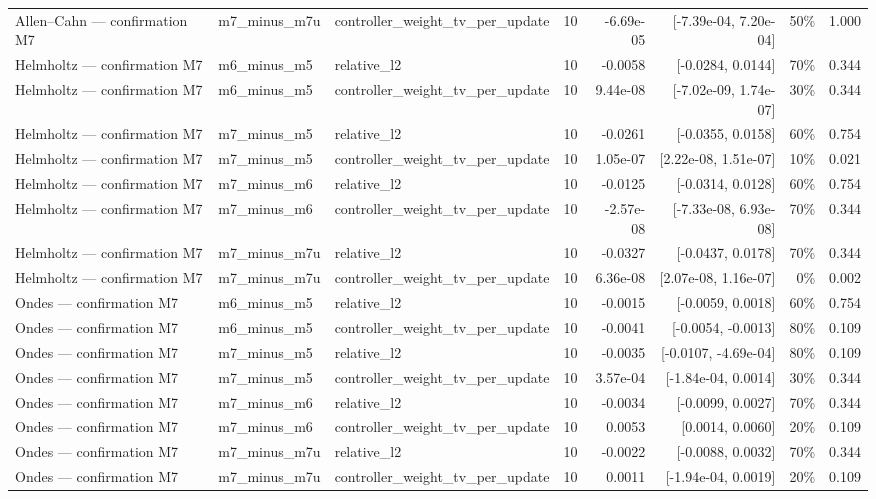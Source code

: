 \begin{tabular}{llllrrrr}
Allen–Cahn — confirmation M7 & m7\_minus\_m7u & controller\_weight\_tv\_per\_update & 10 & -6.69e-05 & [-7.39e-04, 7.20e-04] & 50\% & 1.000 \\
Helmholtz — confirmation M7 & m6\_minus\_m5 & relative\_l2 & 10 & -0.0058 & [-0.0284, 0.0144] & 70\% & 0.344 \\
Helmholtz — confirmation M7 & m6\_minus\_m5 & controller\_weight\_tv\_per\_update & 10 & 9.44e-08 & [-7.02e-09, 1.74e-07] & 30\% & 0.344 \\
Helmholtz — confirmation M7 & m7\_minus\_m5 & relative\_l2 & 10 & -0.0261 & [-0.0355, 0.0158] & 60\% & 0.754 \\
Helmholtz — confirmation M7 & m7\_minus\_m5 & controller\_weight\_tv\_per\_update & 10 & 1.05e-07 & [2.22e-08, 1.51e-07] & 10\% & 0.021 \\
Helmholtz — confirmation M7 & m7\_minus\_m6 & relative\_l2 & 10 & -0.0125 & [-0.0314, 0.0128] & 60\% & 0.754 \\
Helmholtz — confirmation M7 & m7\_minus\_m6 & controller\_weight\_tv\_per\_update & 10 & -2.57e-08 & [-7.33e-08, 6.93e-08] & 70\% & 0.344 \\
Helmholtz — confirmation M7 & m7\_minus\_m7u & relative\_l2 & 10 & -0.0327 & [-0.0437, 0.0178] & 70\% & 0.344 \\
Helmholtz — confirmation M7 & m7\_minus\_m7u & controller\_weight\_tv\_per\_update & 10 & 6.36e-08 & [2.07e-08, 1.16e-07] & 0\% & 0.002 \\
Ondes — confirmation M7 & m6\_minus\_m5 & relative\_l2 & 10 & -0.0015 & [-0.0059, 0.0018] & 60\% & 0.754 \\
Ondes — confirmation M7 & m6\_minus\_m5 & controller\_weight\_tv\_per\_update & 10 & -0.0041 & [-0.0054, -0.0013] & 80\% & 0.109 \\
Ondes — confirmation M7 & m7\_minus\_m5 & relative\_l2 & 10 & -0.0035 & [-0.0107, -4.69e-04] & 80\% & 0.109 \\
Ondes — confirmation M7 & m7\_minus\_m5 & controller\_weight\_tv\_per\_update & 10 & 3.57e-04 & [-1.84e-04, 0.0014] & 30\% & 0.344 \\
Ondes — confirmation M7 & m7\_minus\_m6 & relative\_l2 & 10 & -0.0034 & [-0.0099, 0.0027] & 70\% & 0.344 \\
Ondes — confirmation M7 & m7\_minus\_m6 & controller\_weight\_tv\_per\_update & 10 & 0.0053 & [0.0014, 0.0060] & 20\% & 0.109 \\
Ondes — confirmation M7 & m7\_minus\_m7u & relative\_l2 & 10 & -0.0022 & [-0.0088, 0.0032] & 70\% & 0.344 \\
Ondes — confirmation M7 & m7\_minus\_m7u & controller\_weight\_tv\_per\_update & 10 & 0.0011 & [-1.94e-04, 0.0019] & 20\% & 0.109 \\
\bottomrule
\end{tabular}
